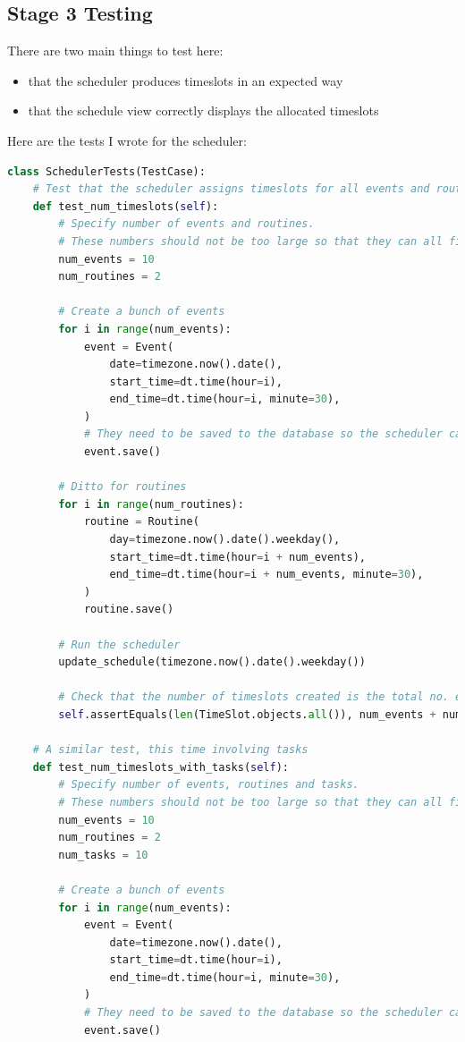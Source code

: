 \documentclass{article}
\begin{document}
\subsection{Stage 3 Testing}
There are two main things to test here:
\begin{itemize}
	\item that the scheduler produces timeslots in an expected way
	\item that the schedule view correctly displays the allocated timeslots
\end{itemize}

Here are the tests I wrote for the scheduler:
\begin{lstlisting}[language=Python]
class SchedulerTests(TestCase):
    # Test that the scheduler assigns timeslots for all events and routines on a day
    def test_num_timeslots(self):
        # Specify number of events and routines.
        # These numbers should not be too large so that they can all fit in the one day.
        num_events = 10
        num_routines = 2

        # Create a bunch of events
        for i in range(num_events):
            event = Event(
                date=timezone.now().date(),
                start_time=dt.time(hour=i),
                end_time=dt.time(hour=i, minute=30),
            )
            # They need to be saved to the database so the scheduler can see them
            event.save()

        # Ditto for routines
        for i in range(num_routines):
            routine = Routine(
                day=timezone.now().date().weekday(),
                start_time=dt.time(hour=i + num_events),
                end_time=dt.time(hour=i + num_events, minute=30),
            )
            routine.save()

        # Run the scheduler
        update_schedule(timezone.now().date().weekday())

        # Check that the number of timeslots created is the total no. events and routines
        self.assertEquals(len(TimeSlot.objects.all()), num_events + num_routines)

    # A similar test, this time involving tasks
    def test_num_timeslots_with_tasks(self):
        # Specify number of events, routines and tasks.
        # These numbers should not be too large so that they can all fit in the one day.
        num_events = 10
        num_routines = 2
        num_tasks = 10

        # Create a bunch of events
        for i in range(num_events):
            event = Event(
                date=timezone.now().date(),
                start_time=dt.time(hour=i),
                end_time=dt.time(hour=i, minute=30),
            )
            # They need to be saved to the database so the scheduler can see them
            event.save()


\end{lstlisting}
\end{document}
